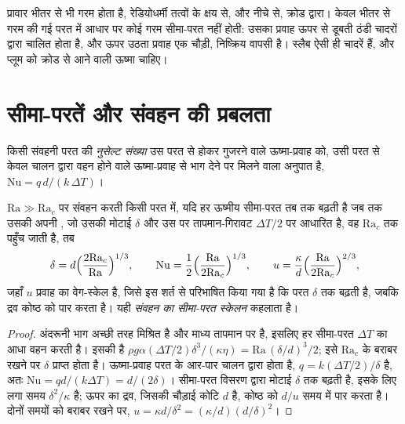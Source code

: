 प्रावार भीतर से भी गरम होता है, रेडियोधर्मी तत्वों के क्षय से,
और नीचे से, क्रोड द्वारा। केवल भीतर से गरम की गई परत में
आधार पर कोई गरम सीमा-परत नहीं होती: उसका प्रवाह ऊपर से डूबती ठंडी चादरों द्वारा
चालित होता है, और ऊपर उठता प्रवाह एक चौड़ी, निष्क्रिय वापसी है। स्लैब ऐसी ही चादरें हैं, और
प्लूम को क्रोड से आने वाली ऊष्मा चाहिए।

\section{सीमा-परतें और संवहन की प्रबलता}

\begin{definition}[नुसेल्ट संख्या]\label{def:b3:mantle-convection:nusselt}
किसी संवहनी परत की \emph{नुसेल्ट संख्या} उस परत से होकर गुजरने वाले
ऊष्मा-प्रवाह को, उसी परत से केवल चालन द्वारा वहन होने वाले ऊष्मा-प्रवाह से भाग देने पर
मिलने वाला अनुपात है, $\mathrm{Nu} = q\,d/(k\,\Delta T)$।
\end{definition}

\begin{theorem}\label{thm:b3:mantle-convection:scaling}
$\mathrm{Ra} \gg \mathrm{Ra}_c$ पर संवहन करती किसी परत में, यदि हर ऊष्मीय
सीमा-परत तब तक बढ़ती है जब तक उसकी अपनी , जो उसकी मोटाई
$\delta$ और उस पर तापमान-गिरावट $\Delta T/2$ पर आधारित है, वह
$\mathrm{Ra}_c$ तक पहुँच जाती है, तब
\[
  \delta = d\Bigl(\frac{2\mathrm{Ra}_c}{\mathrm{Ra}}\Bigr)^{1/3},\qquad
  \mathrm{Nu} = \frac12\Bigl(\frac{\mathrm{Ra}}{2\mathrm{Ra}_c}\Bigr)^{1/3},
  \qquad
  u = \frac\kappa d\Bigl(\frac{\mathrm{Ra}}{2\mathrm{Ra}_c}\Bigr)^{2/3},
\]
जहाँ $u$ प्रवाह का वेग-स्केल है, जिसे इस शर्त से परिभाषित किया गया है कि
परत $\delta$ तक बढ़ती है, जबकि द्रव कोष्ठ को पार करता है। यही
\emph{संवहन का सीमा-परत स्केलन} कहलाता है।
\end{theorem}

\begin{proof}
अंदरूनी भाग अच्छी तरह मिश्रित है और माध्य तापमान पर है, इसलिए हर सीमा-परत
$\Delta T$ का आधा वहन करती है। इसकी  है $\rho g\alpha(\Delta T/2)
\delta^3/(\kappa\eta) = \mathrm{Ra}\,(\delta/d)^3/2$; इसे
$\mathrm{Ra}_c$ के बराबर रखने पर $\delta$ प्राप्त होता है। ऊष्मा-प्रवाह परत के आर-पार चालन द्वारा होता है,
$q = k(\Delta T/2)/\delta$ है, अतः $\mathrm{Nu} = qd/(k\Delta T) = d/(2\delta)$।
सीमा-परत विसरण द्वारा मोटाई $\delta$ तक बढ़ती है, इसके लिए लगा समय
$\delta^2/\kappa$ है; ऊपर का द्रव, जिसकी चौड़ाई कोटि $d$ है, कोष्ठ को
$d/u$ समय में पार करता है। दोनों समयों को बराबर रखने पर, $u = \kappa d/\delta^2 =
(\kappa/d)(d/\delta)^2$।
\end{proof}

